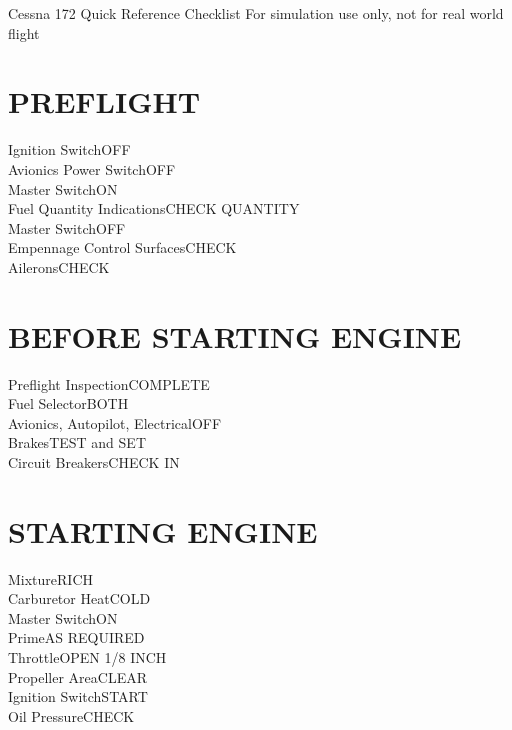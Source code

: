 \documentclass{article}
\begin{document}
\centering
{\fontsize{25}{70}\selectfont Cessna 172}
\break
{\fontsize{20.74}{70}\selectfont Quick Reference Checklist}
\break
\color{Red}
{\fontsize{10}{70}\selectfont For simulation use only, not for real world flight}

\color{Black}
\begin{multicols*}{2}
\section*{PREFLIGHT}
Ignition Switch\dotfill OFF\\
Avionics Power Switch\dotfill OFF\\
Master Switch\dotfill ON\\
Fuel Quantity Indications\dotfill CHECK QUANTITY\\
Master Switch\dotfill OFF\\
Empennage Control Surfaces\dotfill CHECK\\
Ailerons\dotfill CHECK\\
\section*{BEFORE STARTING ENGINE}
Preflight Inspection\dotfill COMPLETE\\
Fuel Selector\dotfill BOTH\\
Avionics, Autopilot, Electrical\dotfill OFF\\
Brakes\dotfill TEST and SET\\
Circuit Breakers\dotfill CHECK IN\\
\section*{STARTING ENGINE}
Mixture\dotfill RICH\\
Carburetor Heat\dotfill COLD\\
Master Switch\dotfill ON\\
Prime\dotfill AS REQUIRED\\
Throttle\dotfill OPEN 1/8 INCH\\
Propeller Area\dotfill CLEAR\\
Ignition Switch\dotfill START\\
Oil Pressure\dotfill CHECK

\end{multicols*}
\end{document}
